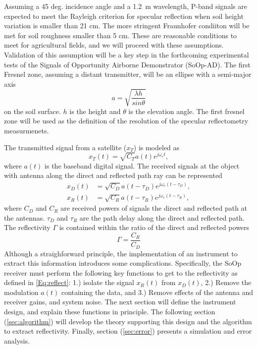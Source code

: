 \documentclass[draftcls,onecolumn]{IEEEtran}  %
\begin{document}
Assuming a 45 deg. incidence angle and a 1.2~m wavelength,  P-band signals are expected to meet the Rayleigh criterion for specular reflection when soil height variation is smaller than 21 cm. The more stringent Fraunhofer condiiton \cite{Ulaby:1981} will be met for soil roughness smaller than 5 cm.  These are reasonable conditions to meet for agricultural fields, and we will proceed with these assumptions.  Validation of this assumption will be a key step in the forthcoming experimental tests of the Signals of Opportunity Airborne Demonstrator (SoOp-AD). 
The first Fresnel zone, assuming a distant transmitter, will be an ellipse with a semi-major axis  
\begin{equation}
    a =\sqrt{\frac{\lambda h}{sin\theta} } 
     \label{Eq: Fresnel_zone_reduce}
\end{equation}
on the soil surface. $h$ is the height and $\theta$ is the elevation angle. The first fresnel zone will be used as the definition of the resolution of the specular reflectometry measurmenets. 

The transmitted signal from a satellite ($x_{T}$) is modeled as
\begin{equation}
	x_T(t)=\sqrt{C_T}a(t)e^{j\omega_et},
    \label{Eq:xT}
\end{equation}
where $a(t)$ is the baseband digital signal.  The received signals at the object with antenna along the direct and reflected path ray can be represented 
\begin{eqnarray}
  	x_D(t)&=\sqrt{C_D}a(t-\tau_D)e^{j\omega_e(t-\tau_D)}, \\
    x_R(t)&=\sqrt{C_R}a(t-\tau_R)e^{j\omega_e(t-\tau_R)}, 
    \label{Eq:xD_xR}
\end{eqnarray}
where $C_D$ and $C_R$ are received powers of signals the direct and reflected path at the antennas.  
$\tau_D$ and $\tau_R$ are the path delay along the direct and reflected path. The reflectivity $\Gamma$ is contained within the ratio of the direct and reflected powers
\begin{equation}
	\Gamma=\frac{C_{R}}{C_{D}}
    \label{Eq:reflect}
\end{equation}
Although a straighforward principle, the implementation of an instrument to extract this information introduces some complications.  
Specifically, the SoOp receiver must perform the following key functions to get to the reflectivity as defined in \ref{Eq:reflect}: 1.) isolate the signal $x_R(t)$ from $x_D(t)$, 2.) Remove the modulation $a(t)$ containing the data, and 3.) Remove effects of the antenna and receiver gains, and system noise.  
The next section will define the instrument design, and explain these functions in principle.  
The following section (\ref{sec:algorithm}) will develop the theory supporting this design and the algorithm to extract reflectivity. 
Finally, section (\ref{sec:error}) presents a simulation and error analysis. 
\end{document}
